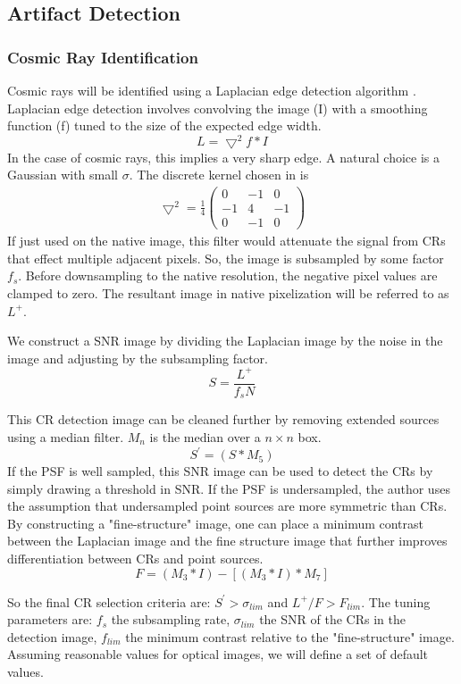 \subsection{Artifact Detection}
\label{sec:acArtifactDetection}

\subsubsection{Cosmic Ray Identification}
\label{sec:acCosmicRayDetection}
Cosmic rays will be identified using a Laplacian edge detection algorithm \citep{dokkum01}.  Laplacian edge detection involves convolving the image (I) with a smoothing function (f) tuned to the size of the expected edge width.
\[
L = \bigtriangledown^2f\ast I
\]
In the case of cosmic rays, this implies a very sharp edge.  A natural choice is a Gaussian with small $\sigma$.  The discrete kernel chosen in \citep{dokkum01} is
\begin{align}
\bigtriangledown^2 = \frac{1}{4}\left( \begin{array}{ccc}
0 & -1 & 0 \\
-1 & 4 & -1 \\
0 & -1 & 0 \end{array} \right)
\end{align}
If just used on the native image, this filter would attenuate the signal from CRs that effect multiple
adjacent pixels.  So, the image is subsampled by some factor $f_s$.  Before downsampling to the native resolution, the negative pixel values are clamped to zero.  The resultant image in native pixelization will be referred to as $L^+$.

We construct a SNR image by dividing the Laplacian image by the noise in the image and adjusting by the subsampling factor.
\[
S = \frac{L^+}{f_s N}
\]

This CR detection image can be cleaned further by removing extended sources using a median filter. $M_n$ is the median over a $n \times n$ box.
\[
S^\prime = (S \ast M_5)
\]
If the PSF is well sampled, this SNR image can be used to detect the CRs by simply drawing a threshold in SNR.
If the PSF is undersampled, the author uses the assumption that undersampled point sources are more symmetric
than CRs.  By constructing a "fine-structure" image, one can place a minimum contrast between the Laplacian image and the fine structure image that further improves differentiation between CRs and point sources.
\[
F = (M_3 \ast I) - [(M_3 \ast I) \ast M_7]
\]

So the final CR selection criteria are: $S^\prime > \sigma_{lim}$ and $L^+/F > F_{lim}$.  The tuning
parameters are: $f_s$ the subsampling rate, $\sigma_{lim}$ the SNR of the CRs in the detection image,
$f_{lim}$ the minimum contrast relative to the "fine-structure" image. Assuming reasonable values for optical
images, we will define a set of default values.

